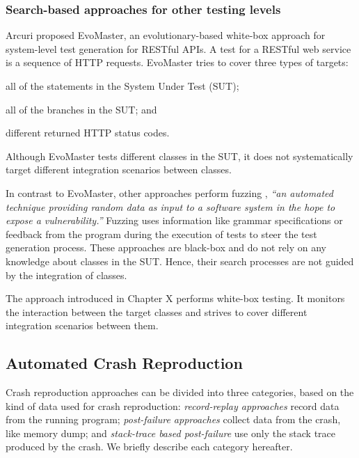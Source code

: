 \subsubsection{Search-based approaches for other testing levels}

Arcuri \cite{Arcuri2019} proposed EvoMaster, an evolutionary-based white-box approach for system-level test generation for RESTful APIs. A test for a RESTful web service is a sequence of HTTP requests. EvoMaster tries to cover three types of targets:
 \begin{inparaenum}[(i)]
 \item all of the statements in the System Under Test (SUT);
 \item all of the branches in the SUT; and
\item different returned HTTP status codes.
\end{inparaenum}
Although EvoMaster tests different classes in the SUT, it does not systematically target different integration scenarios between classes.

In contrast to EvoMaster, other approaches perform fuzzing \cite{Holler2012}, \textit{``an automated technique providing random data as input to a software system in the hope to expose a vulnerability.''} Fuzzing uses information like grammar specifications \cite{Holler2012, beyene2012, coppit2005, godefroid2008} or feedback from the program during the execution of tests \cite{Padhye2019} to steer the test generation process.
These approaches are black-box and do not rely on any knowledge about classes in the SUT. Hence, their search processes are not guided by the integration of classes.

The approach introduced in Chapter X performs white-box testing. It monitors the interaction between the target classes and strives to cover different integration scenarios between them.

\subsection{Automated Crash Reproduction}

Crash reproduction approaches can be divided into three categories, based on the kind of data used for crash reproduction: \emph{record-replay approaches} record data from the running program; \emph{post-failure approaches} collect data from the crash, like memory dump; and \emph{stack-trace based post-failure} use only the stack trace produced by the crash. We briefly describe each category hereafter.


